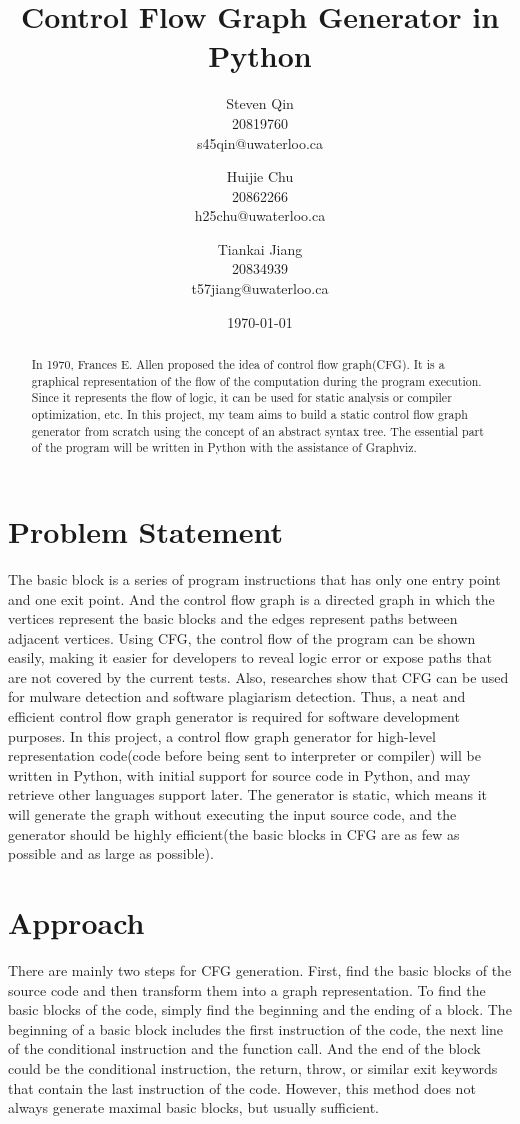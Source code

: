 \documentclass[11pt]{article}
\title{Control Flow Graph Generator in Python}
\author{Steven Qin\\20819760\\s45qin@uwaterloo.ca \and Huijie Chu\\20862266\\h25chu@uwaterloo.ca \and Tiankai Jiang\\20834939\\t57jiang@uwaterloo.ca}
\date{\today}
\begin{document}
\maketitle

\begin{abstract}
In 1970, Frances E. Allen proposed the idea of control flow graph(CFG). It is a graphical representation of the flow of the computation during the program execution. Since it represents the flow of logic, it can be used for static analysis or compiler optimization, etc. In this project, my team aims to build a static control flow graph generator from scratch using the concept of an abstract syntax tree. The essential part of the program will be written in Python with the assistance of Graphviz.
\end{abstract}

\section{Problem Statement}\label{section-problemStatement}
The basic block is a series of program instructions that has only one entry point and one exit point. And the control flow graph is a directed graph in which the vertices represent the basic blocks and the edges represent paths between adjacent vertices. Using CFG, the control flow of the program can be shown easily, making it easier for developers to reveal logic error or expose paths that are not covered by the current tests. Also, researches show that CFG can be used for mulware detection and software plagiarism detection. Thus, a neat and efficient control flow graph generator is required for software development purposes. In this project, a control flow graph generator for high-level representation code(code before being sent to interpreter or compiler) will be written in Python, with initial support for source code in Python, and may retrieve other languages support later. The generator is static, which means it will generate the graph without executing the input source code, and the generator should be highly efficient(the basic blocks in CFG are as few as possible and as large as possible).

\section{Approach}\label{section-approach}
There are mainly two steps for CFG generation. First, find the basic blocks of the source code and then transform them into a graph representation. To find the basic blocks of the code, simply find the beginning and the ending of a block. The beginning of a basic block includes the first instruction of the code, the next line of the conditional instruction and the function call. And the end of the block could be the conditional instruction, the return, throw, or similar exit keywords that contain the last instruction of the code. However, this method does not always generate maximal basic blocks, but usually sufficient. 
\end{document}
